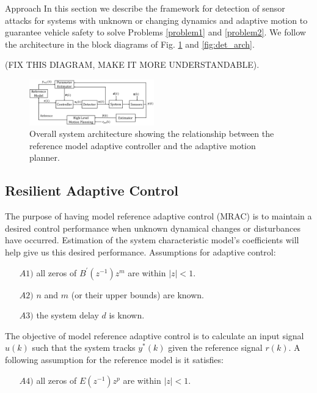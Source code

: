 
\begin{section}{Approach}
\label{sec:approach}
In this section we describe the framework for detection of sensor attacks for systems with unknown or changing dynamics and adaptive motion to guarantee vehicle safety to solve Problems \ref{problem1} and \ref{problem2}. We follow the architecture in the block diagrams of Fig. \ref{fig:system_arch} and \ref{fig:det_arch}. 


(FIX THIS DIAGRAM, MAKE IT MORE UNDERSTANDABLE).
\begin{figure}[ht!]
\vspace{1pt}
\centering
\includegraphics[width=0.48\textwidth]{sys_arch.png}
\caption{Overall system architecture showing the relationship between the reference model adaptive controller and the adaptive motion planner.}
\label{fig:system_arch}
\end{figure}

\subsection{Resilient Adaptive Control}
\label{sec:Res_adapt_control}

The purpose of having model reference adaptive control (MRAC) is to maintain a desired control performance when unknown dynamical changes or disturbances have occurred. Estimation of the system characteristic model's coefficients will help give us this desired performance.
Assumptions for adaptive control: 
	\begin{enumerate}[leftmargin=4\parindent]
	\item[$A1)$] all zeros of $B^{'}(z^{-1})z^m$ are within $|z|<1$. 
	\item[$A2)$] $n$ and $m$ (or their upper bounds) are known. 
	\item[$A3)$] the system delay $d$ is known.
	\end{enumerate}
The objective of model reference adaptive control is to calculate an input signal $u(k)$ such that the system tracks $y^{*}(k)$ given the reference signal $r(k)$. 
A following assumption for the reference model is it satisfies:
    \begin{enumerate}[leftmargin=4\parindent]
	\item[$A4)$] all zeros of $E(z^{-1})z^p$ are within $|z|<1$. 
	\end{enumerate}


\end{section}

